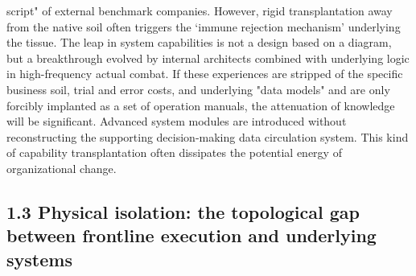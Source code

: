 \documentclass[11pt,a4paper]{article}
\begin{document}
script" of external benchmark companies. However, rigid transplantation away from the native soil often triggers the ‘immune rejection mechanism’ underlying the tissue. The leap in system capabilities is not a design based on a diagram, but a breakthrough evolved by internal architects combined with underlying logic in high-frequency actual combat. If these experiences are stripped of the specific business soil, trial and error costs, and underlying "data models" and are only forcibly implanted as a set of operation manuals, the attenuation of knowledge will be significant. Advanced system modules are introduced without reconstructing the supporting decision-making data circulation system. This kind of capability transplantation often dissipates the potential energy of organizational change.


\subsection*{1.3 Physical isolation: the topological gap between frontline execution and underlying systems}
\end{document}
